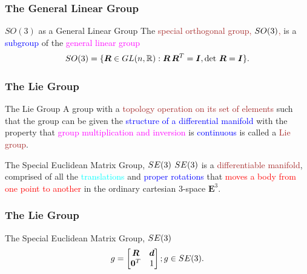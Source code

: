 \begin{frame}
	\frametitle{The General Linear Group}
	\begin{block}{$SO(3)$ as a General Linear Group}
		The \textcolor{brown}{special orthogonal group, $SO(3)$,} is a \textcolor{blue}{subgroup} of the \textcolor{magenta}{general linear group}
		\begin{align}
			SO(3) = \{\bm{R} \in GL(n, \mathbb{R}): \bm{R} \, \bm{R}^T = \bm{I}, \text{det } \bm{R} = \bm{I} \}.
		\end{align}
	\end{block}
\end{frame}

\begin{frame}
	\frametitle{The Lie Group}
	
	\begin{block}{The Lie Group}
		A group with a \textcolor{brown}{topology operation on its set of elements} such that the group can be given the \textcolor{blue}{structure of a differential manifold} with the property that \textcolor{magenta}{group multiplication and inversion} is \textcolor{blue}{continuous} is called a \textcolor{brown}{Lie group}.
	\end{block}
	
	\begin{block}{The Special Euclidean Matrix Group, ${SE}(3)$}
		${SE}(3)$ is a \textcolor{brown}{differentiable manifold}, comprised of all the \textcolor{cyan}{translations} and \textcolor{blue}{proper rotations} that \textcolor{red}{moves a body from one point to another} in the ordinary cartesian 3-space $\textbf{E}^3$.
	\end{block}
\end{frame}

\begin{frame}
	\frametitle{The Lie Group}	
	\begin{block}{The Special Euclidean Matrix Group, ${SE}(3)$}
		\begin{align}
			g = \begin{bmatrix}
				\bm{R} & \bm{d} \\ \bm{0}^T & 1
			\end{bmatrix}; g \in {SE}(3).
			\label{eq:rigid_trans}
		\end{align}
	\end{block}
\end{frame}

